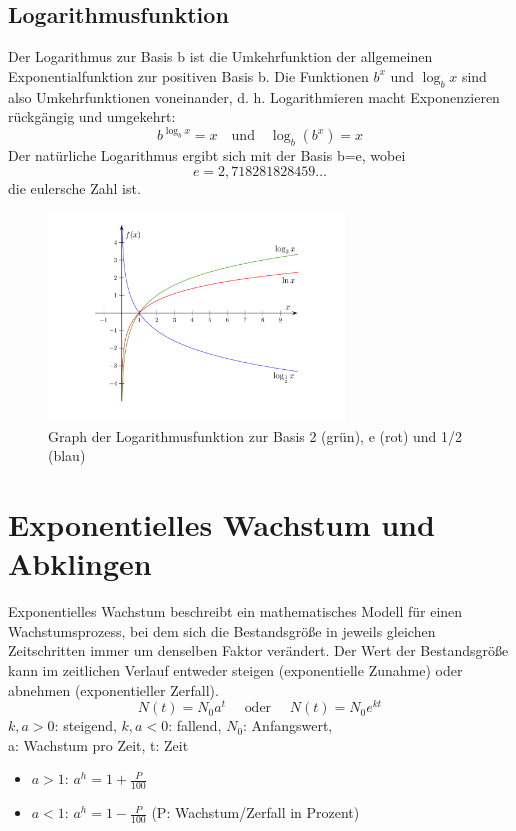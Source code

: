 \documentclass[a4paper]{article}
\begin{document}
\subsection{Logarithmusfunktion}
Der Logarithmus zur Basis b ist die Umkehrfunktion der allgemeinen Exponentialfunktion zur positiven Basis b. Die Funktionen $b^x$ und $\log_b x$ sind also Umkehrfunktionen voneinander, d. h. Logarithmieren macht Exponenzieren rückgängig und umgekehrt:
\[ b^{\log_b x} = x \quad \text{und} \quad \log_b(b^x) = x \]
Der natürliche Logarithmus ergibt sich mit der Basis b=e, wobei
\[e = 2{,}718281828459\ldots\]
die eulersche Zahl ist.
\begin{figure}[h!]
\centering
\includegraphics[width=0.7\textwidth]{images/logarithmusfunktion}\caption{\label{fig:logarithmusfunktion}{Graph der Logarithmusfunktion zur Basis 2 (grün), e (rot) und 1/2 (blau)}}
\end{figure}

\section{Exponentielles Wachstum und Abklingen}
Exponentielles Wachstum beschreibt ein mathematisches Modell für einen Wachstumsprozess, bei dem sich die Bestandsgröße in jeweils gleichen Zeitschritten immer um denselben Faktor verändert. Der Wert der Bestandsgröße kann im zeitlichen Verlauf entweder steigen (exponentielle Zunahme) oder abnehmen (exponentieller Zerfall).
\[ N(t)=N_0a^t \quad \text{ oder } \quad N(t)=N_0e^{kt}\]
$k,a > 0$: steigend, $k,a < 0$: fallend, $N_0$: Anfangswert, \\ a: Wachstum pro Zeit, t: Zeit
\begin{itemize}
\item $a>1$: $a^h=1+\frac{P}{100}$
\item $a<1$: $a^h=1-\frac{P}{100}$ (P: Wachstum/Zerfall in Prozent)
\end{itemize}
\end{document}
